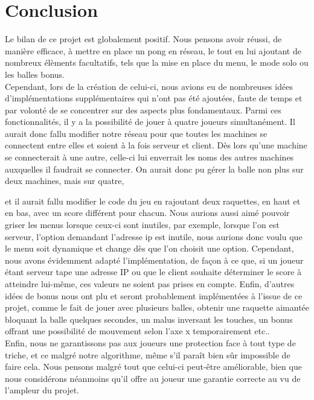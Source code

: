 \chapter{Conclusion}

Le bilan de ce projet est globalement positif. Nous pensons avoir réussi, de manière efficace, à mettre en place 
un pong en réseau, le tout en lui ajoutant de nombreux élèments facultatifs, tels que la mise en place du menu, 
le mode solo ou les balles bonus.
\\
Cependant, lors de la création de celui-ci, nous avions eu de nombreuses idées d'implémentations supplémentaires qui n'ont 
pas été ajoutées, faute de temps et par volonté de se concentrer sur des aspects plus fondamentaux.
Parmi ces fonctionnalités, il y a la possibilité de jouer à quatre joueurs 
simultanément. Il aurait donc fallu modifier notre réseau pour que toutes les machines se connectent entre elles 
et soient à la fois serveur et client. Dès lors qu'une machine se connecterait à une autre, celle-ci lui enverrait 
les noms des 
autres machines auxquelles il faudrait se connecter. On aurait donc pu gérer la balle non plus sur deux machines, 
mais sur quatre, 

et il aurait fallu modifier le code du jeu en rajoutant deux raquettes, en haut et en bas, avec un score différent pour
chacun. Nous aurions aussi aimé pouvoir griser les menus lorsque ceux-ci sont inutiles, par exemple, lorsque l'on est 
serveur, l'option demandant l'adresse ip est inutile, nous aurions donc voulu que le menu soit dynamique et change
dès que l'on 
choisit une option. Cependant, nous avons évidemment adapté l'implémentation, de façon à ce que, si un joueur étant serveur
tape une adresse IP ou que le client souhaite déterminer le score à atteindre lui-même, ces valeurs ne soient pas prises 
en compte. Enfin, d'autres idées de bonus nous ont plu et seront probablement implémentées à l'issue de ce projet, comme 
le fait de jouer avec plusieurs balles, obtenir une raquette aimantée bloquant la balle quelques secondes, un malus 
inversant les touches, un bonus offrant une possibilité de mouvement selon l'axe x temporairement etc..
\\
Enfin, nous ne garantissons pas aux joueurs une protection face à tout type de triche, et ce malgré notre algorithme, 
même s'il paraît bien sûr impossible de faire cela. Nous pensons malgré tout que celui-ci peut-être 
améliorable, bien que nous considérons néanmoins qu'il offre au joueur une garantie correcte au vu de l'ampleur du projet.